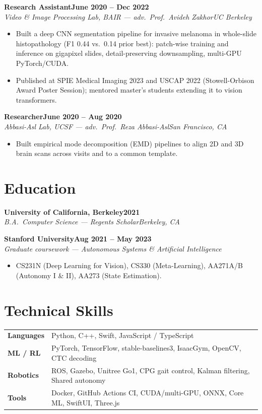 \documentclass[10pt]{article}
\newcommand{\role}[4]{\textbf{#1}\hfill\textbf{#2}\\\textit{#3}\hfill\textit{#4}}
\begin{document}
\role{Research Assistant}{June 2020 -- Dec 2022}{Video \& Image Processing Lab, BAIR --- adv.\ Prof.\ Avideh Zakhor}{UC Berkeley}
\begin{itemize}
\item Built a deep CNN segmentation pipeline for invasive melanoma in whole-slide histopathology (F1 0.44 vs.\ 0.14 prior best): patch-wise training and inference on gigapixel slides, detail-preserving downsampling, multi-GPU PyTorch/CUDA.
\item Published at SPIE Medical Imaging 2023 and USCAP 2022 (Stowell-Orbison Award Poster Session); mentored master's students extending it to vision transformers.
\end{itemize}

\role{Researcher}{June 2020 -- Aug 2020}{Abbasi-Asl Lab, UCSF --- adv.\ Prof.\ Reza Abbasi-Asl}{San Francisco, CA}
\begin{itemize}
\item Built empirical mode decomposition (EMD) pipelines to align 2D and 3D brain scans across visits and to a common template.
\end{itemize}

\section*{Education}

\role{University of California, Berkeley}{2021}{B.A.\ Computer Science --- Regents Scholar}{Berkeley, CA}


\role{Stanford University}{Aug 2021 -- May 2023}{Graduate coursework --- Autonomous Systems \& Artificial Intelligence}{}
\begin{itemize}
\item CS231N (Deep Learning for Vision), CS330 (Meta-Learning), AA271A/B (Autonomy I \& II), AA273 (State Estimation).
\end{itemize}

\section*{Technical Skills}
\begin{tabular}{@{}p{0.9in}l}
\textbf{Languages} & Python, C++, Swift, JavaScript / TypeScript \\
\textbf{ML / RL} & PyTorch, TensorFlow, stable-baselines3, IsaacGym, OpenCV, CTC decoding \\
\textbf{Robotics} & ROS, Gazebo, Unitree Go1, CPG gait control, Kalman filtering, Shared autonomy \\
\textbf{Tools} & Docker, GitHub Actions CI, CUDA/multi-GPU, ONNX, Core ML, SwiftUI, Three.js \\
\end{tabular}
\end{document}
